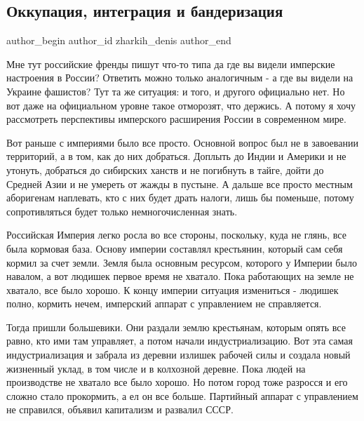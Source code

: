  
 
 
 
 
 
\subsection{Оккупация, интеграция и бандеризация}
\label{sec:08_12_2020.fb.zharkih_denis.1.okkupacia_fascizm}
\ifcmt
	author_begin
   author_id zharkih_denis
	author_end
\fi

Мне тут российские френды пишут что-то типа да где вы видели имперские
настроения в России? Ответить можно только аналогичным - а где вы видели на
Украине фашистов? Тут та же ситуация: и того, и другого официально нет. Но вот
даже на официальном уровне такое отморозят, что держись. А потому я хочу
рассмотреть перспективы имперского расширения России в современном мире. 

Вот раньше с империями было все просто. Основной вопрос был не в завоевании
территорий, а в том, как до них добраться.  Доплыть до Индии и Америки и не
утонуть, добраться до сибирских ханств и не погибнуть в тайге, дойти до Средней
Азии и не умереть от жажды в пустыне.  А дальше все просто местным аборигенам
наплевать, кто с них будет драть налоги, лишь бы поменьше, потому
сопротивляться будет только немногочисленная знать. 

Российская Империя легко росла во все стороны, поскольку, куда не глянь, все
была кормовая база. Основу империи составлял крестьянин, который сам себя
кормил за счет земли. Земля была основным ресурсом, которого у Империи было
навалом, а вот людишек первое время не хватало. Пока работающих на земле не
хватало, все было хорошо. К концу империи ситуация измениться - людишек полно,
кормить нечем, имперский аппарат с управлением не справляется. 

Тогда пришли большевики. Они раздали землю крестьянам, которым опять все равно,
кто ими там управляет, а потом  начали индустриализацию. Вот эта самая
индустриализация и забрала из деревни излишек рабочей силы и создала новый
жизненный уклад, в том числе и в колхозной деревне. Пока людей на производстве
не хватало все было хорошо. Но потом город тоже разросся и его сложно стало
прокормить, а ел он все больше. Партийный аппарат с управлением не справился,
объявил капитализм и развалил СССР. 

